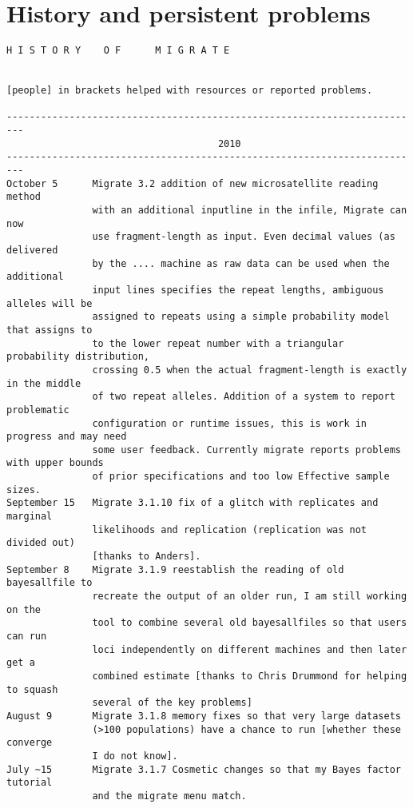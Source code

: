 \chapter{History and persistent problems}
\begin{small}
\begin{verbatim}
H I S T O R Y    O F      M I G R A T E 


[people] in brackets helped with resources or reported problems.

-------------------------------------------------------------------------
                                     2010
-------------------------------------------------------------------------
October 5      Migrate 3.2 addition of new microsatellite reading method
               with an additional inputline in the infile, Migrate can now
               use fragment-length as input. Even decimal values (as delivered
               by the .... machine as raw data can be used when the additional
               input lines specifies the repeat lengths, ambiguous alleles will be 
               assigned to repeats using a simple probability model that assigns to
               to the lower repeat number with a triangular probability distribution, 
               crossing 0.5 when the actual fragment-length is exactly in the middle 
               of two repeat alleles. Addition of a system to report problematic 
               configuration or runtime issues, this is work in progress and may need 
               some user feedback. Currently migrate reports problems with upper bounds
               of prior specifications and too low Effective sample sizes.   
September 15   Migrate 3.1.10 fix of a glitch with replicates and marginal
               likelihoods and replication (replication was not divided out)
               [thanks to Anders].
September 8    Migrate 3.1.9 reestablish the reading of old bayesallfile to
               recreate the output of an older run, I am still working on the 
               tool to combine several old bayesallfiles so that users can run
               loci independently on different machines and then later get a 
               combined estimate [thanks to Chris Drummond for helping to squash
               several of the key problems]
August 9       Migrate 3.1.8 memory fixes so that very large datasets
               (>100 populations) have a chance to run [whether these converge
               I do not know].
July ~15       Migrate 3.1.7 Cosmetic changes so that my Bayes factor tutorial
               and the migrate menu match.

\end{verbatim}
\end{small}
